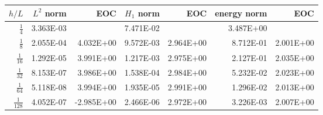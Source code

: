 \begin{table}
  \begin{tabular}{rrrrrrr}
    \hline\hline
    \textbf{$h/{L} $} & \textbf{$L^2$ norm} & \textbf{EOC} & \textbf{$H_1$ norm} & \textbf{EOC} & \textbf{energy norm} & \textbf{EOC} \\\hline
    $\frac{1}{4}$ & 3.363E-03 &  & 7.471E-02 &  & 3.487E+00 &  \\
    $\frac{1}{8}$ & 2.055E-04 & 4.032E+00 & 9.572E-03 & 2.964E+00 & 8.712E-01 & 2.001E+00 \\
    $\frac{1}{16}$ & 1.292E-05 & 3.991E+00 & 1.217E-03 & 2.975E+00 & 2.127E-01 & 2.035E+00 \\
    $\frac{1}{32}$ & 8.153E-07 & 3.986E+00 & 1.538E-04 & 2.984E+00 & 5.232E-02 & 2.023E+00 \\
    $\frac{1}{64}$ & 5.118E-08 & 3.994E+00 & 1.935E-05 & 2.991E+00 & 1.296E-02 & 2.013E+00 \\
    $\frac{1}{128}$ & 4.052E-07 & -2.985E+00 & 2.466E-06 & 2.972E+00 & 3.226E-03 & 2.007E+00 \\\hline\hline
  \end{tabular}
\end{table}
